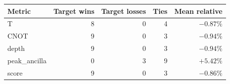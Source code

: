 \begin{tabular}{lrrrr}
\toprule
Metric & Target wins & Target losses & Ties & Mean relative \\
\midrule
T & 8 & 0 & 4 & $-0.87\%$ \\
CNOT & 9 & 0 & 3 & $-0.94\%$ \\
depth & 9 & 0 & 3 & $-0.94\%$ \\
peak_ancilla & 0 & 3 & 9 & $+5.42\%$ \\
score & 9 & 0 & 3 & $-0.86\%$ \\
\bottomrule
\end{tabular}
